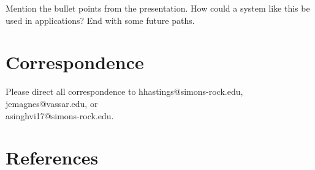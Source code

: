 \documentclass[
    11pt,
]{article}
\begin{document}
Mention the bullet points from the presentation.  How could a system like this be used in applications?  End with some future paths.

\section{Correspondence}\label{correspondence}
\makeatletter
Please direct all correspondence to hhastings@simons-rock.edu,
jemagnes@vassar.edu, or\\asinghvi17@simons-rock.edu.
\makeatother

\section{References}

% 
\printbibliography[heading=none]
\end{document}
